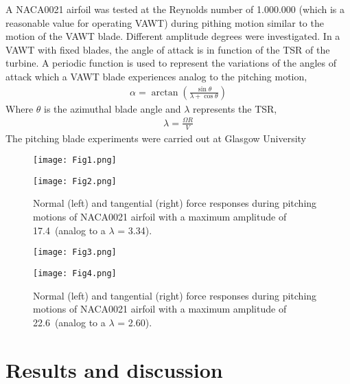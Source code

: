 \documentclass[a4paper]{jpconf}
\begin{document}
A NACA0021 airfoil was tested at the Reynolds number of 1.000.000 (which is a
reasonable value for operating VAWT) during pithing motion similar to the motion
of the VAWT blade. Different amplitude degrees were investigated. In a VAWT with
fixed blades, the angle of attack is in function of the TSR of the turbine. A
periodic function is used to represent the variations of the angles of attack
which a VAWT blade experiences analog to the pitching motion,
\begin{eqnarray}
    \alpha = \arctan \left( \frac{\sin \theta}{\lambda + \cos \theta} \right)
\end{eqnarray}
Where $\theta$ is the azimuthal blade angle and $ \lambda $ represents the TSR,
\begin{eqnarray}
    \lambda =  \frac{\Omega R}{V}
\end{eqnarray}
The pitching blade experiments were carried out at Glasgow
University\cite{angell1988collected}\\

\begin{figure}[h]
\begin{minipage}{18pc}
\texttt{[image: Fig1.png]}
\end{minipage}\hspace{2pc}%
\begin{minipage}{18pc}
\texttt{[image: Fig2.png]}
\end{minipage}
\caption{\label{fig1}Normal (left) and tangential (right) force responses during pitching motions of NACA0021 airfoil with a maximum amplitude of 17.4\degree\ (analog to a $\lambda$ = 3.34).}
\end{figure}


\begin{figure}[h]
\begin{minipage}{18pc}
\texttt{[image: Fig3.png]}
\end{minipage}\hspace{2pc}%
\begin{minipage}{18pc}
\texttt{[image: Fig4.png]}
\end{minipage}
\caption{\label{fig2}Normal (left) and tangential (right) force responses during pitching motions of NACA0021 airfoil with a maximum amplitude of 22.6\degree\ (analog to a $\lambda$ = 2.60).}
\end{figure}

\newpage

\section{Results and discussion}
\end{document}
